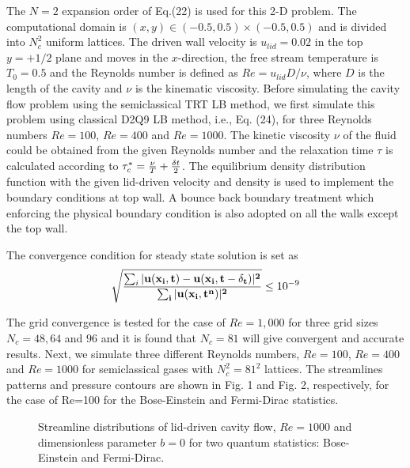 \documentclass[doublecol]{epl2}
\begin{document}
The $N=2$ expansion order of Eq.(22) is used for this 2-D problem. The computational domain is $(x,y) \in  (-0.5,0.5)\times(-0.5,0.5)$ and is divided into $N_c^2$ uniform lattices.   The driven wall velocity is $u_{lid}=0.02$ in the top $y=+1/2$ plane and moves in the $x$-direction, the free stream temperature is $T_{0}=0.5$ and the Reynolds number is defined as $Re =u_{lid} D/\nu$, where $D$ is the length of the cavity and $\nu$ is the kinematic viscosity.   Before simulating the cavity flow problem using the semiclassical TRT LB method, we first simulate this problem using classical D2Q9 LB method, i.e., Eq. (24), for three Reynolds numbers $Re=100$, $Re=400$ and $Re=1000$.   The kinetic viscosity $\nu$ of the fluid could be obtained from the given Reynolds number and the relaxation time $\tau$ is calculated according to $\tau_c^* ={\nu \over T}+\frac{\delta t}{2}$.  The equilibrium density distribution function with the given lid-driven velocity and density is used to implement the boundary conditions at top wall. A  bounce back boundary treatment which enforcing the physical boundary condition is also adopted on all the walls except the top wall.

The convergence condition for steady state solution is set as
\begin{equation}
 \sqrt{ { \sum_i |\bf{u} (\bf{x}_i,t)-\bf{u} (\bf{x}_i,t-\delta_t)|^2 \over \sum_i |\bf{u} (\bf{x}_i, t^n)|^2 } } \leq 10^{-9}
\end{equation}

The grid convergence is tested for the case of $Re=1,000$ for three grid sizes $N_c=48, 64$ and $96$ and it is found that $N_c=81$ will give convergent and accurate results.  Next, we simulate three different Reynolds numbers, $Re=100$, $Re=400$ and $Re=1000$ for semiclassical gases with $N_c^2=81^2$ lattices.
The streamlines patterns and pressure contours are shown in Fig. 1 and Fig. 2, respectively, for the case of Re=100 for the Bose-Einstein and Fermi-Dirac statistics.

\begin{figure}[ht]
	\centering
	\vfill
	\caption[A set of four subfigures.]{Streamline distributions of lid-driven cavity flow, $Re=1000$ and dimensionless parameter $b=0$ for two  quantum statistics:
	 Bose-Einstein and
	 Fermi-Dirac.}
	\label{fig:Streamlines_b0}
\end{figure}
\end{document}
